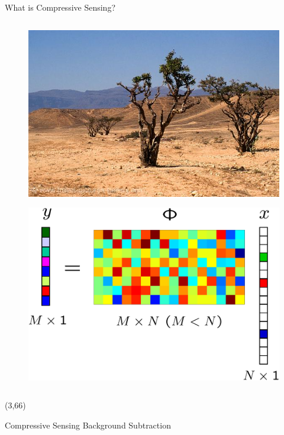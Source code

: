 \documentclass[final]{beamer}
\begin{document}
\begin{frame}{}
\begin{textblock}{36}
\begin{block}{What is Compressive Sensing?}
\begin{columns}
\begin{column}{13cm}
 \begin{figure}[h]
        \centering
        \includegraphics[width = 12cm]{sparseD.jpg}
       \end{figure}

 \begin{figure}[h]
        \centering
        \includegraphics[width = 12cm]{csss}
       \end{figure}
\end{column}%
\end{columns}
  
\end{block}
\end{textblock}


\begin{textblock}{36}(3,66)
  \begin{block}{Compressive Sensing Background Subtraction}


\end{block}
\end{textblock}
\end{frame}
\end{document}
